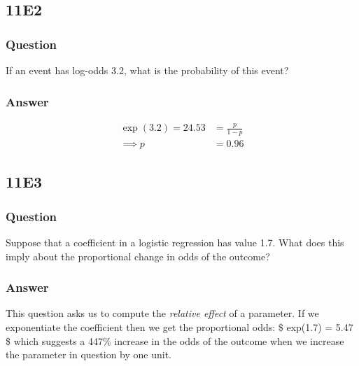 \documentclass[
]{book}
\begin{document}
\hypertarget{e2-6}{%
\subsection*{11E2}\label{e2-6}}

\hypertarget{question-82}{%
\subsubsection*{Question}\label{question-82}}

If an event has log-odds 3.2, what is the probability of this event?

\hypertarget{answer-82}{%
\subsubsection*{Answer}\label{answer-82}}

\[
\begin{aligned}
\exp(3.2) = 24.53 &= \frac{p}{1-p} \\
\implies p &= 0.96
\end{aligned}
\]

\hypertarget{e3-7}{%
\subsection*{11E3}\label{e3-7}}

\hypertarget{question-83}{%
\subsubsection*{Question}\label{question-83}}

Suppose that a coefficient in a logistic regression has value 1.7. What does this imply about the proportional change in odds of the outcome?

\hypertarget{answer-83}{%
\subsubsection*{Answer}\label{answer-83}}

This question asks us to compute the \emph{relative effect} of a parameter. If we exponentiate the coefficient then we get the proportional odds: \$ exp(1.7) = 5.47 \$ which suggests a 447\% increase in the odds of the outcome when we increase the parameter in question by one unit.
\end{document}
